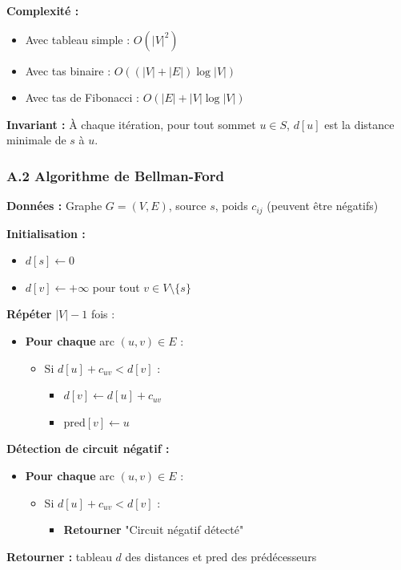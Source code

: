 \documentclass[12pt,a4paper]{article}
\begin{document}
\begin{notecours}
\textbf{Complexité :}
\begin{itemize}
    \item Avec tableau simple : $O(|V|^2)$
    \item Avec tas binaire : $O((|V| + |E|) \log |V|)$
    \item Avec tas de Fibonacci : $O(|E| + |V| \log |V|)$
\end{itemize}

\textbf{Invariant :} À chaque itération, pour tout sommet $u \in S$, $d[u]$ est la distance minimale de $s$ à $u$.
\end{notecours}

\newpage
\subsubsection*{A.2 Algorithme de Bellman-Ford}

\begin{algorithme}
\textbf{Données :} Graphe $G = (V, E)$, source $s$, poids $c_{ij}$ (peuvent être négatifs)

\textbf{Initialisation :}
\begin{itemize}
    \item $d[s] \leftarrow 0$
    \item $d[v] \leftarrow +\infty$ pour tout $v \in V \setminus \{s\}$
\end{itemize}

\textbf{Répéter} $|V| - 1$ fois :
\begin{itemize}
    \item \textbf{Pour chaque} arc $(u,v) \in E$ :
    \begin{itemize}
        \item Si $d[u] + c_{uv} < d[v]$ :
        \begin{itemize}
            \item $d[v] \leftarrow d[u] + c_{uv}$
            \item $\text{pred}[v] \leftarrow u$
        \end{itemize}
    \end{itemize}
\end{itemize}

\textbf{Détection de circuit négatif :}
\begin{itemize}
    \item \textbf{Pour chaque} arc $(u,v) \in E$ :
    \begin{itemize}
        \item Si $d[u] + c_{uv} < d[v]$ :
        \begin{itemize}
            \item \textbf{Retourner} "Circuit négatif détecté"
        \end{itemize}
    \end{itemize}
\end{itemize}

\textbf{Retourner :} tableau $d$ des distances et $\text{pred}$ des prédécesseurs
\end{algorithme}
\end{document}
